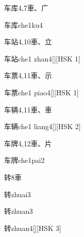 \begin{entry}{车库}{4,7}{⾞、⼴}
  \begin{phonetics}{车库}{che1ku4}
  \end{phonetics}
\end{entry}

\begin{entry}{车站}{4,10}{⾞、⽴}
  \begin{phonetics}{车站}{che1 zhan4}[][HSK 1]
  \end{phonetics}
\end{entry}

\begin{entry}{车票}{4,11}{⾞、⽰}
  \begin{phonetics}{车票}{che1 piao4}[][HSK 1]
  \end{phonetics}
\end{entry}

\begin{entry}{车辆}{4,11}{⾞、⾞}
  \begin{phonetics}{车辆}{che1 liang4}[][HSK 2]
  \end{phonetics}
\end{entry}

\begin{entry}{车牌}{4,12}{⾞、⽚}
  \begin{phonetics}{车牌}{che1pai2}
  \end{phonetics}
\end{entry}

\begin{entry}{转}{8}{⾞}
  \begin{phonetics}{转}{zhuai3}
  \end{phonetics}
  \begin{phonetics}{转}{zhuan3}
  \end{phonetics}
  \begin{phonetics}{转}{zhuan4}[][HSK 3]
  \end{phonetics}
\end{entry}

